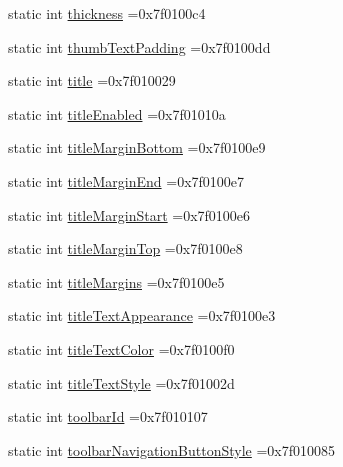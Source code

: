 \begin{DoxyCompactItemize}
\item 
static int \hyperlink{classandroid_1_1support_1_1graphics_1_1drawable_1_1R_1_1attr_a5eb044d76e2e151b982a6a1d4bb6aa3f}{thickness} =0x7f0100c4
\item 
static int \hyperlink{classandroid_1_1support_1_1graphics_1_1drawable_1_1R_1_1attr_a158b375a3bcdc3f6ad3be4d32efc9766}{thumb\+Text\+Padding} =0x7f0100dd
\item 
static int \hyperlink{classandroid_1_1support_1_1graphics_1_1drawable_1_1R_1_1attr_ac9fc993403b5382c2bcaff3ab14d3943}{title} =0x7f010029
\item 
static int \hyperlink{classandroid_1_1support_1_1graphics_1_1drawable_1_1R_1_1attr_a94bc9bbbe96dca429fbdf8c43f0293a7}{title\+Enabled} =0x7f01010a
\item 
static int \hyperlink{classandroid_1_1support_1_1graphics_1_1drawable_1_1R_1_1attr_a8e0ada7ba852dee56bea33539e994ab1}{title\+Margin\+Bottom} =0x7f0100e9
\item 
static int \hyperlink{classandroid_1_1support_1_1graphics_1_1drawable_1_1R_1_1attr_ae5e843a814ff7ec2bfbe144baa81ff5c}{title\+Margin\+End} =0x7f0100e7
\item 
static int \hyperlink{classandroid_1_1support_1_1graphics_1_1drawable_1_1R_1_1attr_a4bf56ec7e4d57758aba4a7a548d3761c}{title\+Margin\+Start} =0x7f0100e6
\item 
static int \hyperlink{classandroid_1_1support_1_1graphics_1_1drawable_1_1R_1_1attr_aba4e0b8f7488530bb023d20d115fd3fa}{title\+Margin\+Top} =0x7f0100e8
\item 
static int \hyperlink{classandroid_1_1support_1_1graphics_1_1drawable_1_1R_1_1attr_a08363a287bec2676fd6e25b8374aa018}{title\+Margins} =0x7f0100e5
\item 
static int \hyperlink{classandroid_1_1support_1_1graphics_1_1drawable_1_1R_1_1attr_ab56b26f4ea1f7e5201d89afb5b192937}{title\+Text\+Appearance} =0x7f0100e3
\item 
static int \hyperlink{classandroid_1_1support_1_1graphics_1_1drawable_1_1R_1_1attr_ae9392c834deb5e76561b418b5d637222}{title\+Text\+Color} =0x7f0100f0
\item 
static int \hyperlink{classandroid_1_1support_1_1graphics_1_1drawable_1_1R_1_1attr_aa7a51408e6331ea887097c76e7e58cc6}{title\+Text\+Style} =0x7f01002d
\item 
static int \hyperlink{classandroid_1_1support_1_1graphics_1_1drawable_1_1R_1_1attr_a221aa0a0308eaf9db8943a2c35728091}{toolbar\+Id} =0x7f010107
\item 
static int \hyperlink{classandroid_1_1support_1_1graphics_1_1drawable_1_1R_1_1attr_a1d07309d29ed1b8802bc51967977a48d}{toolbar\+Navigation\+Button\+Style} =0x7f010085

\end{DoxyCompactItemize}
